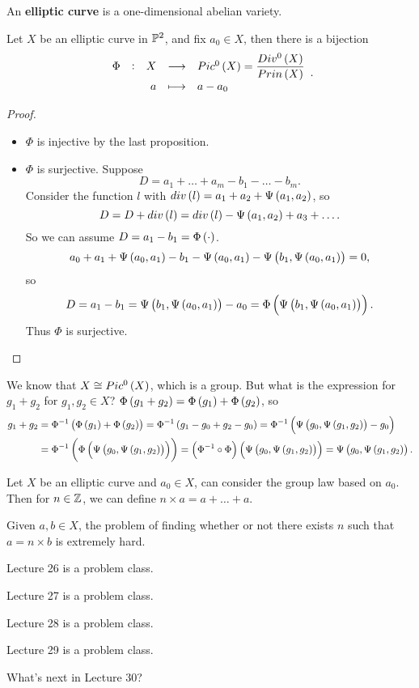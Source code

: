 \begin{definition}
An \textbf{elliptic curve} is a one-dimensional abelian variety.
\end{definition}

\begin{proposition}
Let $ X $ be an elliptic curve in $ \mathbb{P}^2 $, and fix $ a_0 \in X $, then there is a bijection
$$ \function[\Phi]{X}{Pic^0\br{X} = \dfrac{Div^0\br{X}}{Prin\br{X}}}{a}{a - a_0}. $$
\end{proposition}

\begin{proof}
\hfill
\begin{itemize}
\item $ \Phi $ is injective by the last proposition.
\item $ \Phi $ is surjective. Suppose
$$ D = a_1 + \dots + a_m - b_1 - \dots - b_m. $$
Consider the function $ l $ with $ div\br{l} = a_1 + a_2 + \Psi\br{a_1, a_2} $, so
$$ D = D + div\br{l} = div\br{l} - \Psi\br{a_1, a_2} + a_3 + \dots. $$
So we can assume $ D = a_1 - b_1 = \Phi\br{\cdot} $.
$$ a_0 + a_1 + \Psi\br{a_0, a_1} - b_1 - \Psi\br{a_0, a_1} - \Psi\br{b_1, \Psi\br{a_0, a_1}} = 0, $$
so
$$ D = a_1 - b_1 = \Psi\br{b_1, \Psi\br{a_0, a_1}} - a_0 = \Phi\br{\Psi\br{b_1, \Psi\br{a_0, a_1}}}. $$
Thus $ \Phi $ is surjective.
\end{itemize}
\end{proof}

We know that $ X \cong Pic^0\br{X} $, which is a group. But what is the expression for $ g_1 + g_2 $ for $ g_1, g_2 \in X $? $ \Phi\br{g_1 + g_2} = \Phi\br{g_1} + \Phi\br{g_2} $, so
\begin{align*}
g_1 + g_2
& = \Phi^{-1}\br{\Phi\br{g_1} + \Phi\br{g_2}} = \Phi^{-1}\br{g_1 - g_0 + g_2 - g_0} = \Phi^{-1}\br{\Psi\br{g_0, \Psi\br{g_1, g_2}} - g_0} \\
& = \Phi^{-1}\br{\Phi\br{\Psi\br{g_0, \Psi\br{g_1, g_2}}}} = \br{\Phi^{-1} \circ \Phi}\br{\Psi\br{g_0, \Psi\br{g_1, g_2}}} = \Psi\br{g_0, \Psi\br{g_1, g_2}}.
\end{align*}

Let $ X $ be an elliptic curve and $ a_0 \in X $, can consider the group law based on $ a_0 $. Then for $ n \in \mathbb{Z} $, we can define $ n \times a = a + \dots + a $.

\begin{note*}
Given $ a, b \in X $, the problem of finding whether or not there exists $ n $ such that $ a = n \times b $ is extremely hard.
\end{note*}


Lecture 26 is a problem class.


Lecture 27 is a problem class.


Lecture 28 is a problem class.


Lecture 29 is a problem class.


What's next in Lecture 30?

